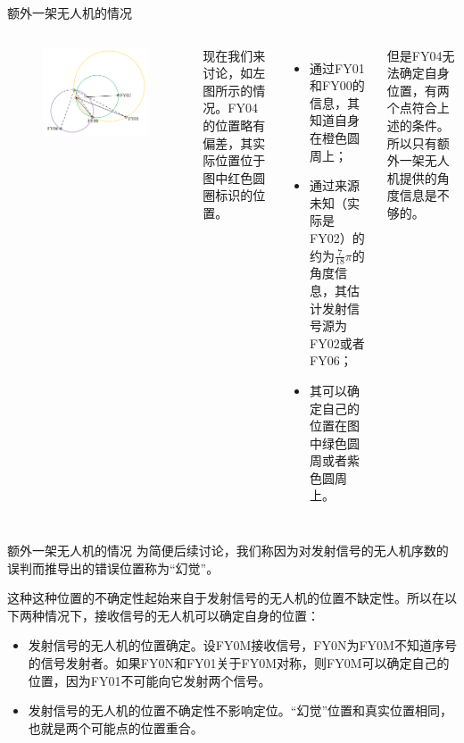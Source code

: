 \documentclass[aspectratio=169]{beamer}
\begin{document}
\begin{frame}{额外一架无人机的情况}
    \begin{columns}
        \begin{figure}[!ht]
            \centering
            \includegraphics[width=\textwidth]{图片/问题1-2示意图2.pdf}
        \end{figure}

        现在我们来讨论，如左图所示的情况。FY04的位置略有偏差，其实际位置位于图中红色圆圈标识的位置。
        \begin{itemize}
            \item 通过FY01和FY00的信息，其知道自身在橙色圆周上；
            \item 通过来源未知（实际是FY02）的约为$\frac{7}{18}\pi$的角度信息，其估计发射信号源为FY02或者FY06；
            \item 其可以确定自己的位置在图中绿色圆周或者紫色圆周上。
        \end{itemize}
        但是FY04无法确定自身位置，有两个点符合上述的条件。所以只有额外一架无人机提供的角度信息是不够的。
    \end{columns}
\end{frame}

\begin{frame}{额外一架无人机的情况}
    为简便后续讨论，我们称因为对发射信号的无人机序数的误判而推导出的错误位置称为“幻觉”。

    这种这种位置的不确定性起始来自于发射信号的无人机的位置不缺定性。所以在以下两种情况下，接收信号的无人机可以确定自身的位置：
    \begin{itemize}
        \item 发射信号的无人机的位置确定。设FY0M接收信号，FY0N为FY0M不知道序号的信号发射者。如果FY0N和FY01关于FY0M对称，则FY0M可以确定自己的位置，因为FY01不可能向它发射两个信号。
        \item 发射信号的无人机的位置不确定性不影响定位。“幻觉”位置和真实位置相同，也就是两个可能点的位置重合。
    \end{itemize}
\end{frame}
\end{document}
